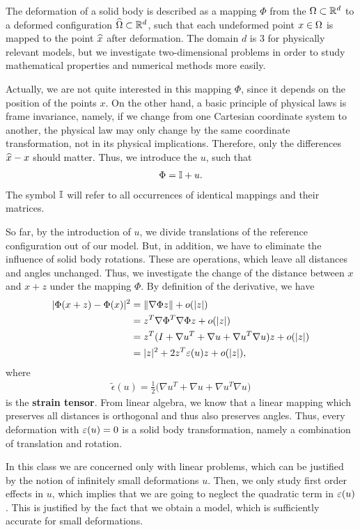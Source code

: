 \begin{intro}
  The deformation of a solid body is described as a mapping $\Phi$
  from the  $\Omega\subset \mathbb R^d$ to a
  deformed configuration $\widehat{\Omega} \subset \mathbb R^d$, such that
  each undeformed point $x\in\Omega$ is mapped to the point
  $\widehat{x}$ after deformation. The domain $d$ is 3 for physically
  relevant models, but we investigate two-dimensional problems in
  order to study mathematical properties and numerical methods more
  easily.

  Actually, we are not quite interested in this mapping $\Phi$, since
  it depends on the position of the points $x$. On the other hand, a
  basic principle of physical laws is frame invariance, namely, if we
  change from one Cartesian coordinate system to another, the physical
  law may only change by the same coordinate transformation, not in
  its physical implications. Therefore, only the differences
  $\widehat{x}-x$ should matter. Thus, we introduce the
   $u$, such that
  \begin{gather*}
    \Phi = \mathbb I + u.
  \end{gather*}
  The symbol $\mathbb I$ will refer to all occurrences of identical mappings
  and their matrices.

  So far, by the introduction of $u$, we divide translations of the
  reference configuration out of our model. But, in addition, we have
  to eliminate the influence of solid body rotations. These are
  operations, which leave all distances and angles unchanged. Thus, we
  investigate the change of the distance between $x$ and $x+z$ under
  the mapping $\Phi$. By definition of the derivative, we have
  \begin{align*}
    \lvert\Phi(x+z) - \Phi(x)\rvert^2 &= \lVert\nabla\Phi z\rVert + o(\lvert z\rvert)
    \\
                              &= z^T\nabla\Phi^T\nabla\Phi z + o(\lvert z\rvert)
    \\
    &= z^T(I + \nabla u^T + \nabla u + \nabla u^T \nabla u) z + o(\lvert z\rvert)
    \\
    &= \lvert z\rvert^2 + 2 z^T\varepsilon(u) z + o(\lvert z\rvert),
  \end{align*}
  where
  \begin{gather}
    \tilde\epsilon(u) = \tfrac12
    \bigl(\nabla u^T + \nabla u + \nabla u^T \nabla u\bigr)
  \end{gather}
  is the \textbf{strain tensor}. From linear algebra, we know that a
  linear mapping which preserves all distances is orthogonal and thus
  also preserves angles. Thus, every deformation with $\varepsilon(u)=0$
  is a solid body transformation, namely a combination of translation
  and rotation.

  In this class we are concerned only with linear problems, which can
  be justified by the notion of infinitely small deformations
  $u$. Then, we only study first order effects in $u$, which implies
  that we are going to neglect the quadratic term in
  $\varepsilon(u)$. This is justified by the fact that we obtain a model,
  which is sufficiently accurate for small deformations.
\end{intro}

